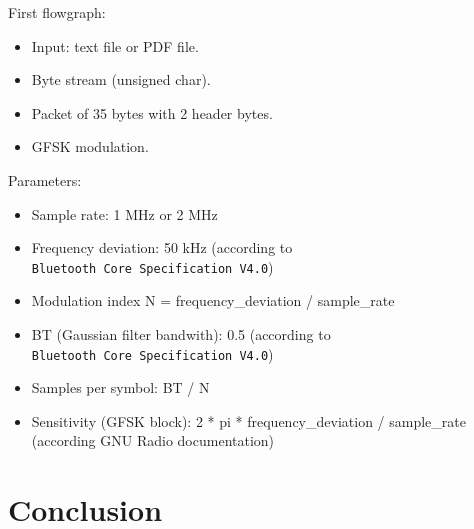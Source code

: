 First flowgraph:

\begin{itemize}
\tightlist
\item
  Input: text file or PDF file.
\item
  Byte stream (unsigned char).
\item
  Packet of 35 bytes with 2 header bytes.
\item
  GFSK modulation.
\end{itemize}

Parameters:

\begin{itemize}
\tightlist
\item
  Sample rate: 1 MHz or 2 MHz
\item
  Frequency deviation: 50 kHz (according to
  \texttt{Bluetooth\ Core\ Specification\ V4.0})
\item
  Modulation index N = frequency\_deviation / sample\_rate
\item
  BT (Gaussian filter bandwith): 0.5 (according to
  \texttt{Bluetooth\ Core\ Specification\ V4.0})
\item
  Samples per symbol: BT / N
\item
  Sensitivity (GFSK block): 2 * pi * frequency\_deviation / sample\_rate
  (according GNU Radio documentation)
\end{itemize}

\section{Conclusion}\label{conclusion-1}
